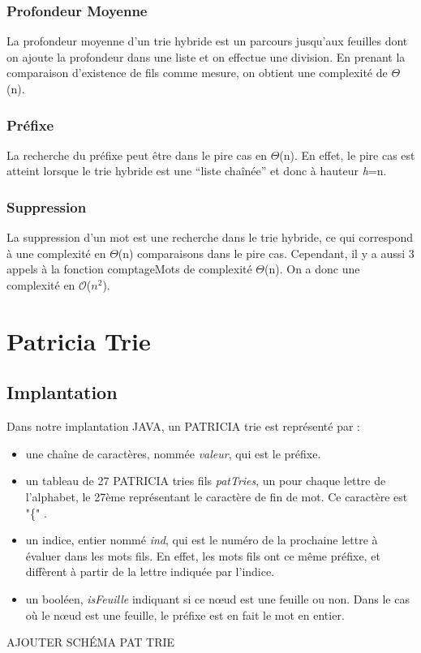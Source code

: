 \documentclass[a4paper,12pt]{report}
\begin{document}
\subsection{Profondeur Moyenne}
La profondeur moyenne d'un trie hybride est un parcours jusqu'aux feuilles dont on ajoute la profondeur dans une liste et on effectue
une division. En prenant la comparaison d'existence de fils comme mesure, on obtient une complexité de $\Theta$(n).

\subsection{Préfixe}
La recherche du préfixe peut être dans le pire cas en $\Theta$(n). En effet, le pire cas est atteint lorsque le trie hybride
est une ``liste chaînée'' et donc à hauteur \textit{h}=n.

\subsection{Suppression}
La suppression d'un mot est une recherche dans le trie hybride, ce qui correspond à une complexité en $\Theta$(n) comparaisons
dans le pire cas. Cependant, il y a aussi 3 appels à la fonction comptageMots de complexité $\Theta$(n).
On a donc une complexité en $\mathcal{O}$($n^2$).

\chapter{Patricia Trie}
\section{Implantation}
Dans notre implantation JAVA, un PATRICIA trie est représenté par :
\begin{itemize}
\item une chaîne de caractères, nommée {\itshape valeur}, qui est le préfixe.
\item un tableau de 27 PATRICIA tries fils {\itshape patTries}, un pour chaque lettre de l'alphabet, le 27ème représentant le caractère de fin de mot. Ce caractère est "\{" .
\item un indice, entier nommé {\itshape ind}, qui est le numéro de la prochaine lettre à évaluer dans les mots fils. En effet, les mots fils ont ce même préfixe, et diffèrent à partir de la lettre indiquée par l'indice.
\item un booléen, {\itshape isFeuille} indiquant si ce nœud est une feuille ou non. Dans le cas où le nœud est une feuille, le préfixe est en fait le mot en entier.
\end{itemize}
 \bigbreak
AJOUTER SCHÉMA PAT TRIE
\end{document}
